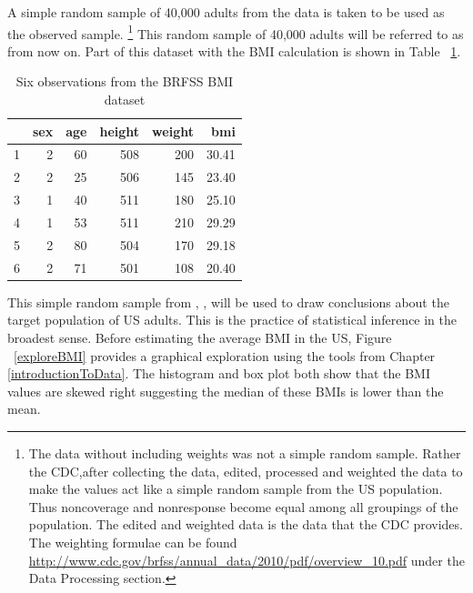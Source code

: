 A simple random sample of 40,000 adults from the  data is taken to be used as the observed sample. \footnote{The  data without including weights was not a simple random sample. Rather the CDC,after collecting the data, edited, processed and weighted the data to make the values act like a simple random sample from the US population. Thus noncoverage and nonresponse become equal among all groupings of the population. The edited and weighted data is the  data that the CDC provides. The weighting formulae can be found \url{http://www.cdc.gov/brfss/annual_data/2010/pdf/overview_10.pdf} under the Data Processing section.} This random sample of 40,000 adults will be referred to as  from now on. Part of this dataset with the BMI calculation is shown in Table ~\ref{brfssBMIData}. 

\begin{table}[ht]
\centering
\begin{tabular}{rrrrrr}
  \hline
 & sex & age & height & weight & bmi \\ 
  \hline
1 &   2 &  60 & 508 & 200 & 30.41 \\ 
  2 &   2 &  25 & 506 & 145 & 23.40 \\ 
  3 &   1 &  40 & 511 & 180 & 25.10 \\ 
  4 &   1 &  53 & 511 & 210 & 29.29 \\ 
  5 &   2 &  80 & 504 & 170 & 29.18 \\ 
  6 &   2 &  71 & 501 & 108 & 20.40 \\ 
   \hline
\end{tabular}
\caption{Six observations from the BRFSS BMI dataset} 
\label{brfssBMIData}
\end{table}

This simple random sample from , , will be used to draw conclusions about the target population of US adults. This is the practice of statistical inference in the broadest sense. Before estimating the average BMI in the US, Figure ~\ref{exploreBMI} provides a graphical exploration using the tools from Chapter \ref{introductionToData}. The histogram and box plot both show that the BMI values are skewed right suggesting the median of these BMIs is lower than the mean. 

